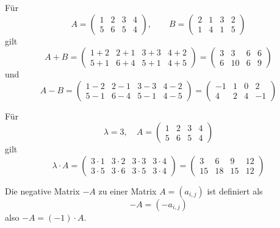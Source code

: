 \begin{beispiel} Für 
 	$$ A = \left( \begin{matrix} 1 & 2 & 3 & 4 \\  5 & 6 & 5 & 4 \end{matrix} \right), \qquad
    	B = \left( \begin{matrix} 2 & 1 & 3 & 2 \\  1 & 4 & 1 & 5 \end{matrix} \right) $$
gilt
 	$$ A + B = \left( \begin{matrix} 1 +2 & 2 +1 & 3+3 & 4+2 \\  5+1 & 6+4 & 5+1 & 4+5 \end{matrix} \right)
    	= \left( \begin{matrix} 3 & 3 & 6 & 6 \\  6 & 10 & 6 & 9 \end{matrix} \right) $$
und 
 	$$ A - B = \left( \begin{matrix} 1-2 & 2-1 & 3-3 & 4-2 \\  5-1 & 6-4 & 5-1 & 4-5 \end{matrix} \right)
    	= \left( \begin{matrix} -1 & 1 & 0 & 2 \\  4 & 2 & 4 & -1 \end{matrix} \right) $$
\end{beispiel}

\begin{beispiel} Für 
  	$$ \lambda = 3, \quad A = \left( \begin{matrix} 1 & 2 & 3 & 4 \\  5 & 6 & 5 & 4 \end{matrix} \right) $$
gilt
  	$$ \lambda \cdot A = \left( \begin{matrix} 3 \cdot 1 & 3 \cdot 2 & 3 \cdot 3 & 3 \cdot 4 \\ 
	3 \cdot 5 & 3 \cdot 6 & 3 \cdot 5 & 3 \cdot 4 \end{matrix} \right)
    	=  \left( \begin{matrix} 3 & 6 & 9 & 12 \\  15 & 18 & 15 & 12 \end{matrix} \right) $$
\end{beispiel}

\begin{definition} Die negative Matrix $-A$ zu einer Matrix $A = \left( a_{i,j} \right)$ ist definiert als
  	$$ - A = \left( -a_{i,j} \right) $$
also $- A = (-1) \cdot A$.
\end{definition}

